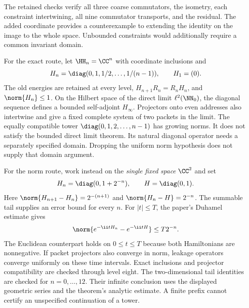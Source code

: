 The retained checks verify all three coarse commutators, the isometry, each constraint intertwining, all nine commutator transports, and the residual. The added coordinate provides a counterexample to extending the identity on the image to the whole space. Unbounded constraints would additionally require a common invariant domain.

For the exact route, let $\HH_n=\CC^n$ with coordinate inclusions and
\[
H_n=\diag(0,1,1/2,\ldots,1/(n-1)),\qquad H_1=(0).
\]
The old energies are retained at every level, $H_{n+1}R_n=R_nH_n$, and $\norm{H_n}\leq1$. On the Hilbert space of the direct limit $\ell^2(\NN_0)$, the diagonal sequence defines a bounded self-adjoint $H_\infty$. Projectors onto even addresses also intertwine and give a fixed complete system of two packets in the limit.
The equally compatible tower $\diag(0,1,2,\ldots,n-1)$ has growing norms. It does not satisfy the bounded direct limit theorem. Its natural diagonal operator needs a separately specified domain. Dropping the uniform norm hypothesis does not supply that domain argument.

For the norm route, work instead on the \emph{single fixed space} $\CC^2$ and set
\[
H_n=\diag(0,1+2^{-n}),\qquad H=\diag(0,1).
\]
Here $\norm{H_{n+1}-H_n}=2^{-(n+1)}$ and $\norm{H_n-H}=2^{-n}$. The summable tail supplies an error bound for every $n$. For $|t|\leq T$, the paper's Duhamel estimate gives
\[
\norm{e^{-\ii tH_n}-e^{-\ii tH}}\leq T2^{-n}.
\]
The Euclidean counterpart holds on $0\leq t\leq T$ because both Hamiltonians are nonnegative. If packet projectors also converge in norm, leakage operators converge uniformly on these time intervals.
Exact inclusions and projector compatibility are checked through level eight. The two-dimensional tail identities are checked for $n=0,\ldots,12$. Their infinite conclusion uses the displayed geometric series and the theorem's analytic estimate. A finite prefix cannot certify an unspecified continuation of a tower.


